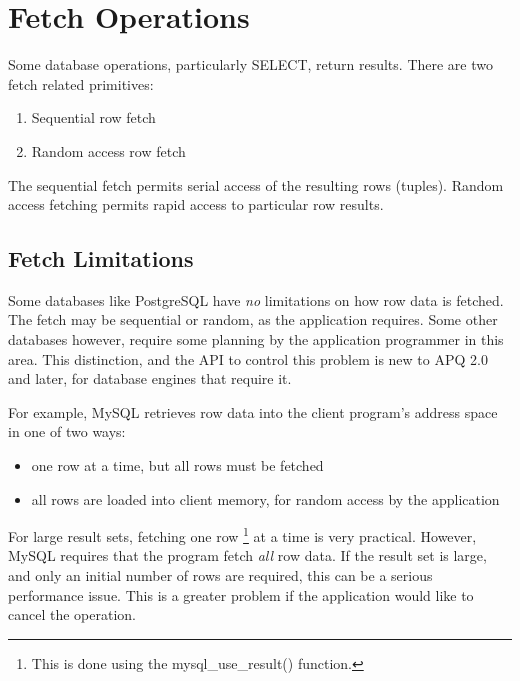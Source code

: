 \documentclass[english,letterpaper]{book}
\begin{document}
\section{Fetch Operations}

Some database operations, particularly SELECT, return
results. There are two fetch related primitives: 

\begin{enumerate}
   \item Sequential row fetch
   \item Random access row fetch
\end{enumerate}

The sequential fetch permits serial access of the resulting rows (tuples).
Random access fetching permits rapid access to particular row results.

\subsection{Fetch Limitations\label{Fetch Limitations}}

Some databases like PostgreSQL have \emph{no} limitations on how row
data is fetched. The fetch may be sequential or random, as the application
requires. Some other databases however, require some planning by the
application programmer in this area. This distinction, and the API
to control this problem is new to APQ 2.0 and later, for database
engines that require it.

For example, MySQL retrieves row data into the client program's address
space in one of two ways:

\begin{itemize}
   \item one row at a time, but all rows must be fetched
   \item all rows are loaded into client memory, for random access by the application
\end{itemize}

For large result sets, fetching one row%
\footnote{This is done using the mysql\_use\_result() function.%
} at a time is very practical. However, MySQL requires that the program
fetch \emph{all} row data. If the result set is large, and only an
initial number of rows are required, this can be a serious performance
issue. This is a greater problem if the application would like to
cancel the operation.
\end{document}
